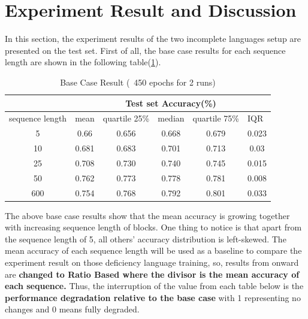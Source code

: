 \documentclass[12pt]{article}
\begin{document}
\section{Experiment Result and Discussion} 
In this section, the experiment results of the two incomplete languages setup are presented on the test set. First of all, the base case results  for each sequence length are shown in the following table(\ref{tab:basecaseResult}).

\begin{table}[!h]
\begin{center}
\begin{tabular}{c|ccccc|}
\cline{2-5}
\multicolumn{1}{l|}{}                 & \multicolumn{5}{c|}{Test set Accuracy(\%)}                                                                                         \\ \hline
\multicolumn{1}{|c|}{sequence length} & \multicolumn{1}{c|}{mean}  & \multicolumn{1}{l|}{quartile 25\%} & \multicolumn{1}{l|}{median} & \multicolumn{1}{l|}{quartile 75\%} & \multicolumn{1}{l|}{IQR} \\ \hline
\multicolumn{1}{|c|}{5}               & \multicolumn{1}{c|}{0.66}  & \multicolumn{1}{c|}{0.656}         & \multicolumn{1}{c|}{0.668}  & \multicolumn{1}{c|}{0.679} & 0.023                            \\ \hline
\multicolumn{1}{|c|}{10}              & \multicolumn{1}{c|}{0.681} & \multicolumn{1}{c|}{0.683}         & \multicolumn{1}{c|}{0.701}  & \multicolumn{1}{c|}{0.713} & 0.03                             \\ \hline
\multicolumn{1}{|c|}{25}              & \multicolumn{1}{c|}{0.708} & \multicolumn{1}{c|}{0.730}         & \multicolumn{1}{c|}{0.740}  & \multicolumn{1}{c|}{0.745} & 0.015                            \\ \hline
\multicolumn{1}{|c|}{50}              & \multicolumn{1}{c|}{0.762} & \multicolumn{1}{c|}{0.773}         & \multicolumn{1}{c|}{0.778}  & \multicolumn{1}{c|}{0.781}  & 0.008                            \\ \hline
\multicolumn{1}{|c|}{600}             & \multicolumn{1}{c|}{0.754} & \multicolumn{1}{c|}{0.768}         & \multicolumn{1}{c|}{0.792}  & \multicolumn{1}{c|}{0.801}  &0.033                           \\ \hline
\end{tabular}
\caption{Base Case Result (~450 epochs for 2 runs)}
\label{tab:basecaseResult}
\end{center}
\end{table}
The above base case results show that the mean accuracy is growing together with increasing sequence length of blocks. One thing to notice is that apart from the sequence length of 5, all others' accuracy distribution is left-skewed. The mean accuracy of each sequence length will be used as a baseline to compare the experiment result on those deficiency language training, so, results from onward are \textbf{changed to Ratio Based where the divisor is the mean accuracy of each sequence.} Thus, the interruption of the value from each table below is the \textbf{performance degradation relative to the base case} with 1 representing no changes and 0 means fully degraded.
\end{document}
